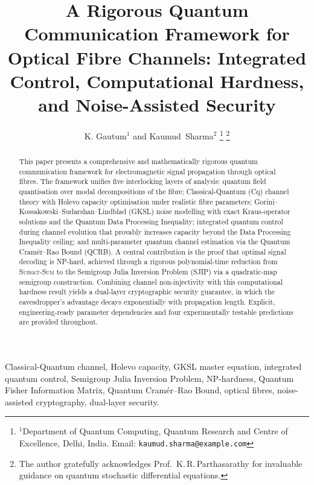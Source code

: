 \documentclass[journal,twocolumn]{IEEEtran}
\theoremstyle{definition}
\theoremstyle{plain}
\begin{document}

\title{A Rigorous Quantum Communication Framework for Optical
Fibre Channels: Integrated Control, Computational Hardness,
and Noise-Assisted Security}

\author{K. Gautum$^{1}$ and Kaumud~Sharma$^{2}$%
  \thanks{$^{1}$Department of Quantum Computing, Quantum Research
    and Centre of Excellence, Delhi, India.
    Email: \texttt{kaumud.sharma@example.com}}%
  \thanks{The author gratefully acknowledges Prof.~K.\,R.\,Parthasarathy
    for invaluable guidance on quantum stochastic differential equations.}%
}

\maketitle

\begin{abstract}
This paper presents a comprehensive and mathematically rigorous
quantum communication framework for electromagnetic signal propagation
through optical fibres.  The framework unifies five interlocking
layers of analysis: quantum field quantisation over modal
decompositions of the fibre; Classical-Quantum (Cq) channel theory
with Holevo capacity optimisation under realistic fibre parameters;
Gorini--Kossakowski--Sudarshan--Lindblad (GKSL) noise modelling with
exact Kraus-operator solutions and the Quantum Data Processing
Inequality; integrated quantum control during channel evolution that
provably increases capacity beyond the Data Processing Inequality
ceiling; and multi-parameter quantum channel estimation via the
Quantum Cram\'{e}r--Rao Bound (QCRB).  A central contribution is the
proof that optimal signal decoding is NP-hard, achieved through a
rigorous polynomial-time reduction from \textsc{Subset-Sum} to the
Semigroup Julia Inversion Problem (SJIP) via a quadratic-map
semigroup construction.  Combining channel non-injectivity with this
computational hardness result yields a dual-layer cryptographic
security guarantee, in which the eavesdropper's advantage decays
exponentially with propagation length.  Explicit, engineering-ready
parameter dependencies and four experimentally testable predictions
are provided throughout.
\end{abstract}

\begin{IEEEkeywords}
Classical-Quantum channel, Holevo capacity, GKSL master equation,
integrated quantum control, Semigroup Julia Inversion Problem,
NP-hardness, Quantum Fisher Information Matrix, Quantum
Cram\'{e}r--Rao Bound, optical fibres, noise-assisted cryptography,
dual-layer security.
\end{IEEEkeywords}
\end{document}
